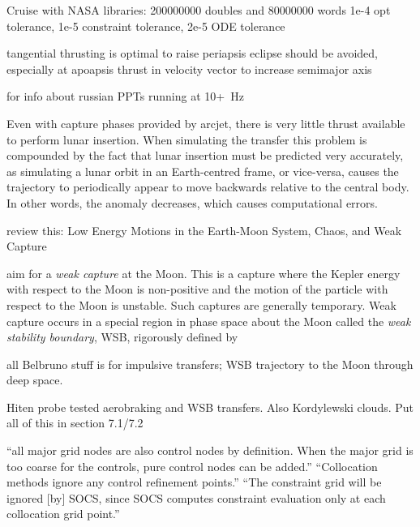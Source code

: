 Cruise with NASA libraries: 200000000 doubles and 80000000 words
1e-4 opt tolerance, 1e-5 constraint tolerance, 2e-5 ODE tolerance



tangential thrusting is optimal to raise periapsis
eclipse should be avoided, especially at apoapsis
thrust in velocity vector to increase semimajor axis 
\textcite{Racca9}


\cite{Cabrera2011} for info about russian PPTs running at 10+~Hz





Even with capture phases provided by arcjet, there is very little thrust available to perform lunar insertion. When simulating the transfer this problem is compounded by the fact that lunar insertion must be predicted very accurately, as simulating a lunar orbit in an Earth-centred frame, or vice-versa, causes the trajectory to periodically appear to move backwards relative to the central body. In other words, the anomaly decreases, which causes computational errors.

review this: Low Energy Motions in the Earth-Moon System, Chaos, and Weak Capture \parencite{Belbruno2007}

aim for a \emph{weak capture} at the Moon. This is a capture where the Kepler energy with respect to the Moon is non-positive and the motion of the particle with respect to the Moon is unstable. Such captures are generally temporary. Weak capture occurs in a special region in phase space about the Moon called the \emph{weak stability boundary}, WSB, rigorously defined by \textcite{Belbruno2004}

all Belbruno stuff is for impulsive transfers; WSB trajectory to the Moon through deep space.

Hiten probe tested aerobraking and WSB transfers. Also Kordylewski clouds.
Put all of this in section 7.1/7.2

\cite{ASTOS_guide} \enquote{all major grid nodes are also control nodes by definition. When the major grid is too coarse for the controls, pure control nodes can be added.} \enquote{Collocation methods ignore any control refinement points.} \enquote{The constraint grid will be ignored [by] SOCS, since SOCS computes constraint evaluation only at each collocation grid point.}
